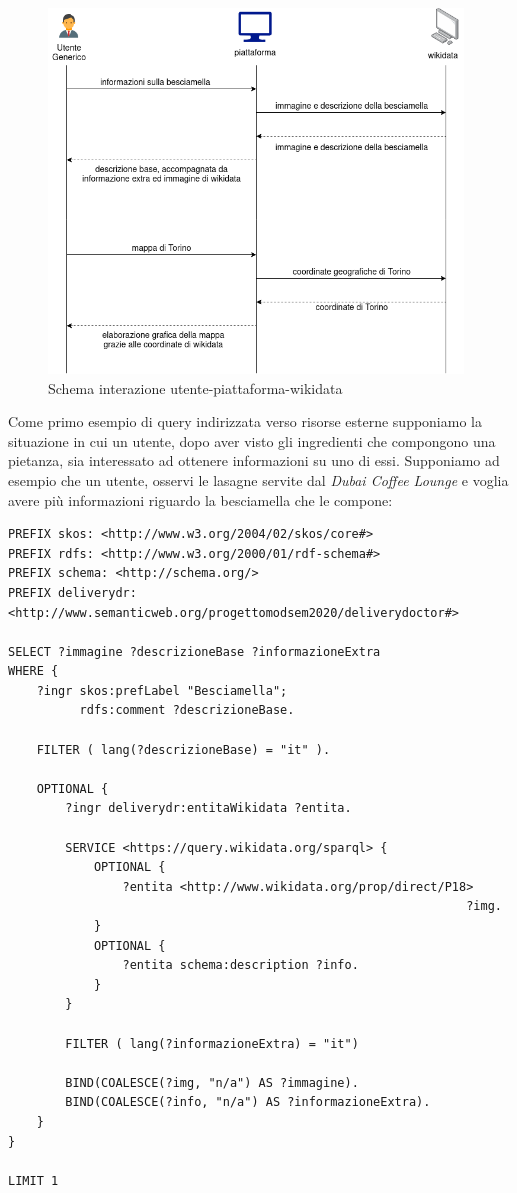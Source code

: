\documentclass[12pt]{article}
\begin{document}
\begin{figure}[H]
    \centering
         \includegraphics[width=11cm]{files/interazioneEsterna.png}
    \caption{Schema interazione utente-piattaforma-wikidata}
\end{figure}
Come primo esempio di query indirizzata verso risorse esterne supponiamo la situazione in cui un utente, dopo aver visto gli ingredienti che compongono una pietanza, sia interessato ad ottenere informazioni su uno di essi.
\newline
Supponiamo ad esempio che un utente, osservi le lasagne servite dal \textit{Dubai Coffee Lounge} e voglia avere più informazioni riguardo la besciamella che le compone:
\begin{lstlisting}[language=SPARQL]
PREFIX skos: <http://www.w3.org/2004/02/skos/core#>
PREFIX rdfs: <http://www.w3.org/2000/01/rdf-schema#>
PREFIX schema: <http://schema.org/>
PREFIX deliverydr: 
<http://www.semanticweb.org/progettomodsem2020/deliverydoctor#>

SELECT ?immagine ?descrizioneBase ?informazioneExtra
WHERE {
    ?ingr skos:prefLabel "Besciamella";
          rdfs:comment ?descrizioneBase.

    FILTER ( lang(?descrizioneBase) = "it" ).
    
    OPTIONAL {
        ?ingr deliverydr:entitaWikidata ?entita.
    
        SERVICE <https://query.wikidata.org/sparql> {
            OPTIONAL {
                ?entita <http://www.wikidata.org/prop/direct/P18>
                                                                ?img.
            }
            OPTIONAL {
                ?entita schema:description ?info.
            }
        }
    
        FILTER ( lang(?informazioneExtra) = "it")
    
        BIND(COALESCE(?img, "n/a") AS ?immagine).
        BIND(COALESCE(?info, "n/a") AS ?informazioneExtra).
    }
}

LIMIT 1
\end{lstlisting}
\end{document}
